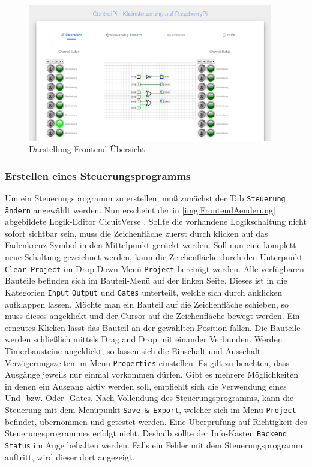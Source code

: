  \begin{figure}[H]
	\begin{center}
		\includegraphics[width=0.95\textwidth]{./images/FrontendUebersicht.png}
		\caption{Darstellung Frontend Übersicht}
		\label{img:FrontendUebersicht}
	\end{center} 
\end{figure}

\subsubsection{Erstellen eines Steuerungsprogramms}

Um ein Steuerungsprogramm zu erstellen, muß zunächst der Tab \texttt{Steuerung ändern} angewählt werden. Nun erscheint der in \autoref{img:FrontendAenderung} abgebildete Logik-Editor CicuitVerse \cite{URL:CircuitVerse}. Sollte die vorhandene Logikschaltung nicht sofort sichtbar sein, muss die Zeichenfläche zuerst durch klicken auf das Fadenkreuz-Symbol in den Mittelpunkt gerückt werden. Soll nun eine komplett neue Schaltung gezeichnet werden, kann die Zeichenfläche durch den Unterpunkt \texttt{Clear Project} im Drop-Down Menü \texttt{Project} bereinigt werden. Alle verfügbaren Bauteile befinden sich im Bauteil-Menü auf der linken Seite. Dieses ist in die Kategorien \texttt{Input} \texttt{Output} und \texttt{Gates} unterteilt, welche sich durch anklicken aufklappen lassen. Möchte man ein Bauteil auf die Zeichenfläche schieben, so muss dieses angeklickt und der Cursor auf die  Zeichenfläche bewegt werden. Ein erneutes Klicken lässt das Bauteil  an der gewählten Position fallen. Die Bauteile werden schließlich mittels Drag and Drop mit einander Verbunden. Werden Timerbausteine angeklickt, so  lassen  sich die Einschalt und Ausschalt- Verzögerungszeiten im Menü \texttt{Properties} einstellen. Es gilt zu beachten, dass Ausgänge jeweils nur einmal vorkommen dürfen. Gibt es mehrere Möglichkeiten in denen ein Ausgang aktiv werden soll, empfiehlt sich die Verwendung eines Und- bzw. Oder- Gates.  Nach Vollendung des Steuerungsprogramms, kann die Steuerung mit dem Menüpunkt \texttt{Save \& Export}, welcher sich im Menü \texttt{Project} befindet, übernommen und getestet werden. Eine Überprüfung auf Richtigkeit des Steuerungsprogrammes erfolgt nicht. Deshalb sollte der Info-Kasten \texttt{Backend Status} im Auge behalten werden. Falls ein Fehler mit dem Steuerungsprogramm auftritt, wird dieser dort angezeigt. 
	

